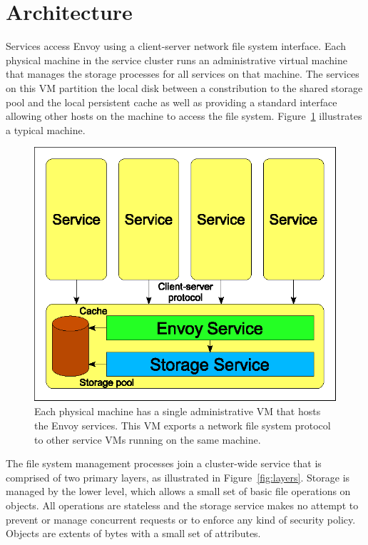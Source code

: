 \section{Architecture}

Services access Envoy using a client-server network file system interface. Each physical machine in the service cluster runs an administrative virtual machine that manages the storage processes for all services on that machine. The services on this VM partition the local disk between a constribution to the shared storage pool and the local persistent cache as well as providing a standard interface allowing other hosts on the machine to access the file system. Figure~\ref{fig:single-machine} illustrates a typical machine.

\begin{figure}[tp]
\centering
\includegraphics{figures/single-machine}
\caption{Each physical machine has a single administrative VM that hosts the Envoy services. This VM exports a network file system protocol to other service VMs running on the same machine.}
\label{fig:single-machine}
\end{figure}

The file system management processes join a cluster-wide service that is comprised of two primary layers, as illustrated in Figure~\ref{fig:layers}. Storage is managed by the lower level, which allows a small set of basic file operations on objects. All operations are stateless and the storage service makes no attempt to prevent or manage concurrent requests or to enforce any kind of security policy. Objects are extents of bytes with a small set of attributes.

